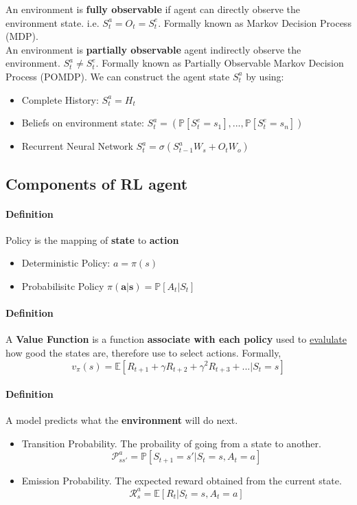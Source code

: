 \documentclass{article}
\begin{document}
	An environment is \textbf{fully observable} if agent can directly observe the environment state. i.e. $S^a_t = O_t = S^e_t$. Formally known as Markov Decision Process (MDP).\\
	An environment is \textbf{partially observable} agent indirectly observe the environment. $S^a_t \ne S^e_t $. Formally known as Partially Observable Markov Decision Process (POMDP). We can construct the agent state $S^a_t$ by using:
	\begin{itemize}
		\item Complete History: $S^a_t = H_t$
		\item Beliefs on environment state: $S^a_t = (\mathbb{P}[S^e_t = s_1],...,\mathbb{P}[S^e_t = s_n] )$
		\item Recurrent Neural Network $S^a_t = \sigma(S^a_{t-1} W_s + O_t W_o)$
	\end{itemize}
	
	\subsection{Components of RL agent}
	\paragraph{Definition} Policy is the mapping of \textbf{state} to \textbf{action}
	\begin{itemize}
		\item Deterministic Policy: $a = \pi(s)$
		\item Probabilisitc Policy $ \pi(\mathbf{a|s}) = \mathbb{P}[A_t|S_t] $
	\end{itemize}
	\paragraph{Definition} A \textbf{Value Function} is a function \textbf{associate with each policy} used to \underline{evalulate} how good the states are, therefore use to select actions. Formally,
	\begin{equation*}
	v_{\pi}(s) = \mathbb{E}[R_{t+1} + \gamma R_{t+2} + \gamma^2R_{t+3} + ... | S_t = s]
	\end{equation*}
	\paragraph{Definition} A model predicts what the \textbf{environment} will do next.
	\begin{itemize}
		\item Transition Probability. The probaility of going from a state to another.
		\begin{equation*}
		\mathcal{P}^a_{ss'} = \mathbb{P}[S_{t+1} = s' | S_t = s, A_t = a]
		\end{equation*}
		\item Emission Probability. The expected reward obtained from the current state. 
		\begin{equation*}
		\mathcal{R}^a_s = \mathbb{E}[R_t | S_t = s, A_t = a]
		\end{equation*}
	\end{itemize}
	
\end{document}
